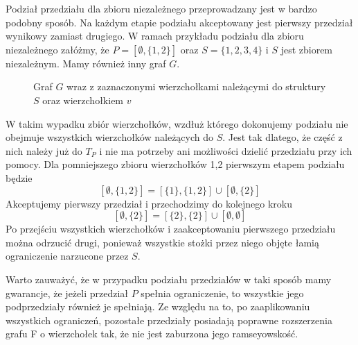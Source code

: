 Podział przedziału dla zbioru niezależnego przeprowadzany jest w bardzo podobny sposób. Na każdym etapie podziału akceptowany jest pierwszy przedział wynikowy zamiast drugiego. W ramach przykładu podziału dla zbioru niezależnego załóżmy, że 
$P = [\emptyset,\{1,2\}]$ oraz $S = \{1,2,3,4\}$ i $S$ jest zbiorem niezależnym. Mamy również inny graf $G$.
\begin{figure}[H]
  \centering
    \caption{Graf $G$ wraz z zaznaczonymi wierzchołkami należącymi do struktury $S$ oraz wierzchołkiem $v$}
 \end{figure}
 

W takim wypadku zbiór wierzchołków, wzdłuż którego dokonujemy podziału nie obejmuje wszystkich wierzchołków należących do $S$. Jest tak dlatego, że część z nich należy już do $T_P$ i nie ma potrzeby ani możliwości dzielić przedziału przy ich pomocy. Dla pomniejszego zbioru wierzchołków {1,2} pierwszym etapem podziału będzie 
$$[{\emptyset},\{1,2\}]= [\{1\},\{1,2\}] \cup [{\emptyset},\{2\}]$$ Akceptujemy pierwszy przedział i przechodzimy do kolejnego kroku
$$ [{\emptyset},\{2\}]= [\{2\},\{2\}] \cup [{\emptyset},{\emptyset}]$$ Po przejściu wszystkich wierzchołków i zaakceptowaniu pierwszego przedziału można odrzucić drugi, ponieważ wszystkie stożki przez niego objęte łamią ograniczenie narzucone przez $S$.

Warto zauważyć, że w przypadku podziału przedziałów w taki sposób mamy gwarancje, że jeżeli przedział $P$ spełnia ograniczenie, to wszystkie jego podprzedziały również je spełniają. Ze względu na to, po zaaplikowaniu wszystkich ograniczeń, pozostałe przedziały posiadają poprawne rozszerzenia grafu F o wierzchołek tak, że nie jest zaburzona jego ramseyowskość. 
